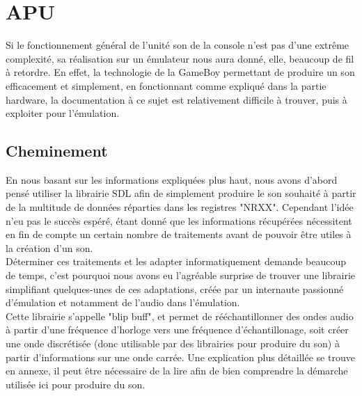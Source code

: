 \documentclass{report}
\begin{document}
\section{APU}
	Si le fonctionnement général de l'unité son de la console n'est pas d'une extrême complexité, sa réalisation sur un émulateur nous aura donné, elle, beaucoup de fil à retordre.
	En effet, la technologie de la GameBoy permettant de produire un son efficacement et simplement, en fonctionnant comme expliqué dans la partie hardware, la documentation à ce sujet est relativement difficile à trouver, puis à exploiter pour l'émulation.\\
\subsection{Cheminement}
	En nous basant sur les informations expliquées plus haut, nous avons d'abord pensé utiliser la librairie SDL afin de simplement produire le son souhaité à partir de la multitude de données réparties dans les registres "NRXX". Cependant l'idée n'eu pas le succès espéré, étant donné que les informations récupérées nécessitent en fin de compte un certain nombre de traitements avant de pouvoir être utiles à la création d'un son.\\
	Déterminer ces traitements et les adapter informatiquement demande beaucoup de temps, c'est pourquoi nous avons eu l'agréable surprise de trouver une librairie simplifiant quelques-unes de ces adaptations, créée par un internaute passionné d'émulation et notamment de l'audio dans l'émulation.\\
	Cette librairie s'appelle "blip buff", et permet de rééchantillonner des ondes audio à partir d'une fréquence d'horloge vers une fréquence d'échantillonage, soit créer une onde discrétisée (donc utilisable par des librairies pour produire du son) à partir d'informations sur une onde carrée. 
	Une explication plus détaillée se trouve en annexe, il peut être nécessaire de la lire afin de bien comprendre la démarche utilisée ici pour produire du son.
\end{document}
